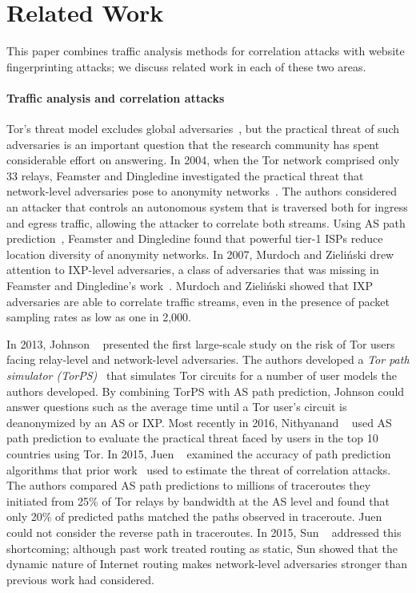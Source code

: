 \section{Related Work}
\label{sec:related_work}

This paper combines traffic analysis methods for correlation attacks
with website fingerprinting attacks; we discuss related work in each of
these two areas.

\paragraph{Traffic analysis and correlation attacks}
Tor's threat model excludes global adversaries~\cite{Dingledine2004a}, but the
practical threat of such adversaries is an important question that the
research community has
spent considerable effort on answering.  In 2004, when the Tor network comprised
only 33 relays, Feamster and Dingledine investigated the practical threat that
network-level adversaries pose to anonymity networks~\cite{Feamster2004a}.  
The authors considered an attacker that controls an autonomous
system that is traversed both for ingress and egress traffic, allowing the
attacker to correlate both streams.  Using AS path prediction~\cite{Gao2001a},
Feamster and Dingledine found that powerful tier-1 ISPs reduce location
diversity of anonymity networks.  In 2007, Murdoch and Zieli\'{n}ski drew
attention to IXP-level adversaries, a class of adversaries that was missing in
Feamster and Dingledine's work~\cite{Murdoch2007a}.  Murdoch and Zieli\'{n}ski
showed that IXP adversaries are able to correlate traffic streams, even in the
presence of packet sampling rates as low as one in 2,000.  

In 2013, Johnson
\ea~\cite{Johnson2013a} presented the first large-scale study on the risk of Tor
users facing relay-level and network-level adversaries.  The authors developed a
{\em Tor path simulator (TorPS)}~\cite{TorPS} that simulates Tor circuits for a number
of user models the authors developed.  By combining TorPS with AS path
prediction, Johnson \ea could answer questions such as the average time until a
Tor user's circuit is deanonymized by an AS or IXP.  Most recently in 2016,
Nithyanand \ea~\cite{Nithyanand2016a} used AS path prediction to evaluate the
practical threat faced by users in the top 10 countries using Tor.  In 2015,
Juen \ea~\cite{Juen2015a} examined the accuracy of path prediction algorithms
that prior work~\cite{Johnson2013a,Feamster2004a} used to estimate the threat of
correlation attacks.  The authors compared AS path predictions to millions of
traceroutes they initiated from 25\% of Tor relays by bandwidth at the
AS level and found that
only 20\% of predicted paths matched the paths observed in traceroute.
Juen \ea could not consider the reverse path in traceroutes.  In 2015,
Sun \ea~\cite{Sun2015a} addressed this shortcoming; although past work treated
routing as static, Sun \ea showed that the dynamic nature of Internet
routing makes network-level adversaries stronger than previous work had considered.

